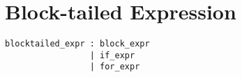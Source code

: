 \section{Block-tailed Expression}

\begin{verbatim}
blocktailed_expr : block_expr
                 | if_expr
                 | for_expr
\end{verbatim}
